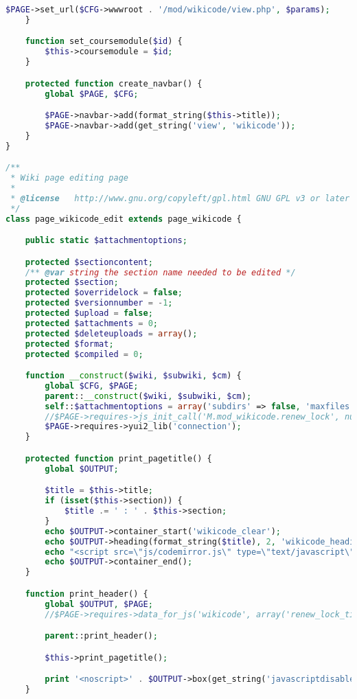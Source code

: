 \begin{lstlisting}[language=PHP]
        $PAGE->set_url($CFG->wwwroot . '/mod/wikicode/view.php', $params);
    }

    function set_coursemodule($id) {
        $this->coursemodule = $id;
    }

    protected function create_navbar() {
        global $PAGE, $CFG;

        $PAGE->navbar->add(format_string($this->title));
        $PAGE->navbar->add(get_string('view', 'wikicode'));
    }
}

/**
 * Wiki page editing page
 *
 * @license   http://www.gnu.org/copyleft/gpl.html GNU GPL v3 or later
 */
class page_wikicode_edit extends page_wikicode {

    public static $attachmentoptions;

    protected $sectioncontent;
    /** @var string the section name needed to be edited */
    protected $section;
    protected $overridelock = false;
    protected $versionnumber = -1;
    protected $upload = false;
    protected $attachments = 0;
    protected $deleteuploads = array();
    protected $format;
	protected $compiled = 0;

    function __construct($wiki, $subwiki, $cm) {
        global $CFG, $PAGE;
        parent::__construct($wiki, $subwiki, $cm);
        self::$attachmentoptions = array('subdirs' => false, 'maxfiles' => - 1, 'maxbytes' => $CFG->maxbytes, 'accepted_types' => '*');
        //$PAGE->requires->js_init_call('M.mod_wikicode.renew_lock', null, true);
        $PAGE->requires->yui2_lib('connection');
    }

    protected function print_pagetitle() {
        global $OUTPUT;

        $title = $this->title;
        if (isset($this->section)) {
            $title .= ' : ' . $this->section;
        }
        echo $OUTPUT->container_start('wikicode_clear');
        echo $OUTPUT->heading(format_string($title), 2, 'wikicode_headingtitle');
		echo "<script src=\"js/codemirror.js\" type=\"text/javascript\"></script>";
        echo $OUTPUT->container_end();
    }

    function print_header() {
        global $OUTPUT, $PAGE;
        //$PAGE->requires->data_for_js('wikicode', array('renew_lock_timeout' => LOCK_TIMEOUT - 5, 'pageid' => $this->page->id, 'section' => $this->section));

        parent::print_header();

        $this->print_pagetitle();

        print '<noscript>' . $OUTPUT->box(get_string('javascriptdisabledlocks', 'wikicode'), 'errorbox') . '</noscript>';
    }


\end{lstlisting}
